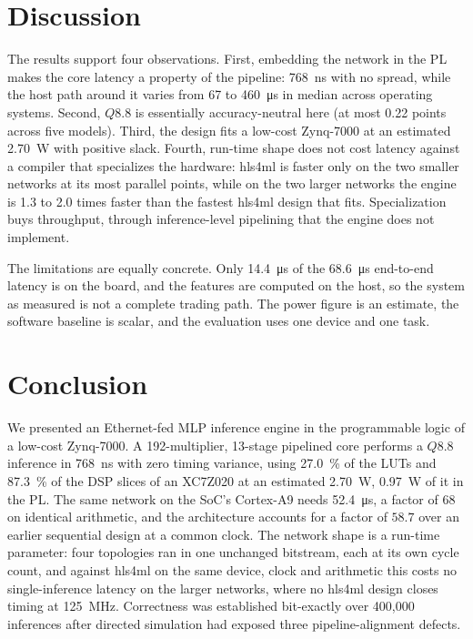 \documentclass[final,5p,times,twocolumn]{elsarticle}
\begin{document}
\section{Discussion}
The results support four observations. First, embedding the network in the PL
makes the core latency a property of the pipeline: \SI{768}{\nano\second} with
no spread, while the host path around it varies from \SI{67}{} to
\SI{460}{\micro\second} in median across operating systems. Second, $Q8.8$ is
essentially accuracy-neutral here (at most 0.22 points across five models).
Third, the design fits a low-cost Zynq-7000 at an estimated \SI{2.70}{\watt}
with positive slack. Fourth, run-time shape does not cost latency against a
compiler that specializes the hardware: hls4ml is faster only on the two smaller
networks at its most parallel points, while on the two larger networks the
engine is 1.3 to 2.0 times faster than the fastest hls4ml design that fits.
Specialization buys throughput, through inference-level pipelining that the
engine does not implement.

The limitations are equally concrete. Only \SI{14.4}{\micro\second} of the
\SI{68.6}{\micro\second} end-to-end latency is on the board, and the features are
computed on the host, so the system as measured is not a complete trading path.
The power figure is an estimate, the software baseline is scalar, and the
evaluation uses one device and one task.

\section{Conclusion}
We presented an Ethernet-fed MLP inference engine in the programmable logic of a
low-cost Zynq-7000. A 192-multiplier, 13-stage pipelined core performs a $Q8.8$
inference in \SI{768}{\nano\second} with zero timing variance, using
\SI{27.0}{\percent} of the LUTs and \SI{87.3}{\percent} of the DSP slices of an
XC7Z020 at an estimated \SI{2.70}{\watt}, \SI{0.97}{\watt} of it in the PL. The
same network on the SoC's Cortex-A9 needs \SI{52.4}{\micro\second}, a factor of
68 on identical arithmetic, and the architecture accounts for a factor of
$58.7$ over an earlier sequential design at a common clock. The network shape is
a run-time parameter: four topologies ran in one unchanged bitstream, each at
its own cycle count, and against hls4ml on the same device, clock and arithmetic
this costs no single-inference latency on the larger networks, where no hls4ml
design closes timing at \SI{125}{\mega\hertz}. Correctness was established
bit-exactly over 400{,}000 inferences after directed simulation had exposed three
pipeline-alignment defects.
\end{document}

